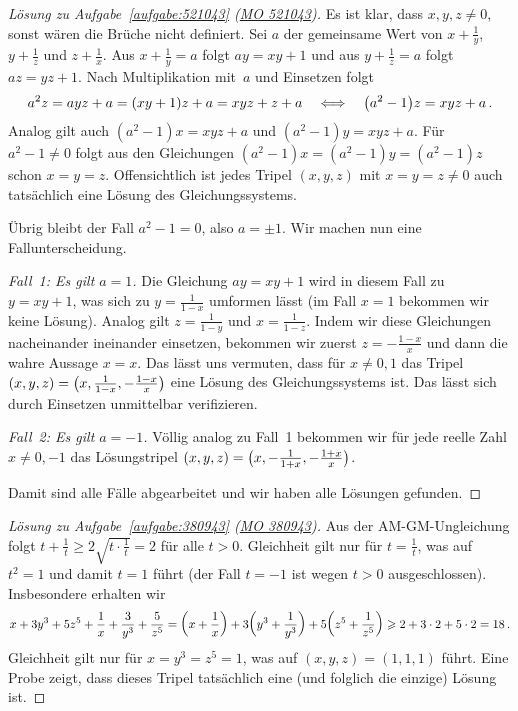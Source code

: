 \begin{proof}[Lösung zu Aufgabe~\ref{aufgabe:521043} \textmd{(\href{https://www.mathematik-olympiaden.de/moev/index.php?option=com_download&thema=a&format=raw&datei=A52094a.pdf}{MO 521043})}]
	Es ist klar, dass $x,y,z\neq 0$, sonst wären die Brüche nicht definiert. Sei $a$ der gemeinsame Wert von $x+\frac 1y$, $y+\frac 1z$ und $z+\frac 1x$. Aus $x+\frac 1y=a$ folgt $ay=xy+1$ und aus $y+\frac 1z=a$ folgt $az=yz+1$. Nach Multiplikation mit~$a$ und Einsetzen folgt
	\begin{equation*}
		a^2z=ayz+a=(xy+1)z+a=xyz+z+a\quad\Longleftrightarrow \quad\parens*{a^2-1}z=xyz+a\,.
	\end{equation*}
	Analog gilt auch $(a^2-1)x=xyz+a$ und $(a^2-1)y=xyz+a$. Für $a^2-1\neq 0$ folgt aus den Gleichungen $(a^2-1)x=(a^2-1)y=(a^2-1)z$ schon $x=y=z$. Offensichtlich ist jedes Tripel $(x,y,z)$ mit $x=y=z\neq 0$ auch tatsächlich eine Lösung des Gleichungssystems.
	
	Übrig bleibt der Fall $a^2-1=0$, also $a=\pm 1$. Wir machen nun eine Fallunterscheidung.
	
	\emph{Fall~1: Es gilt $a=1$.} Die Gleichung $ay=xy+1$ wird in diesem Fall zu $y=xy+1$, was sich zu $y=\frac{1}{1-x}$ umformen lässt (im Fall $x=1$ bekommen wir keine Lösung). Analog gilt $z=\frac{1}{1-y}$ und $x=\frac{1}{1-z}$. Indem wir diese Gleichungen nacheinander ineinander einsetzen, bekommen wir zuerst $z=-\frac{1-x}{x}$ und dann die wahre Aussage $x=x$. Das lässt uns vermuten, dass für $x\neq 0,1$ das Tripel $(x,y,z)=\parens[\big]{x,\frac{1}{1-x},-\frac{1-x}{x}}$ eine Lösung des Gleichungssystems ist. Das lässt sich durch Einsetzen unmittelbar verifizieren.
	
	
	\emph{Fall~2: Es gilt $a=-1$.} Völlig analog zu Fall~1 bekommen wir für jede reelle Zahl $x\neq 0,-1$ das Lösungstripel $(x,y,z)=\parens[\big]{x,-\frac{1}{1+x},-\frac{1+x}{x}}$.
	
	Damit sind alle Fälle abgearbeitet und wir haben alle Lösungen gefunden.
\end{proof}
\begin{proof}[Lösung zu Aufgabe~\ref{aufgabe:380943} \textmd{(\href{https://www.mathematik-olympiaden.de/moev/index.php?option=com_download&thema=a&format=raw&datei=A38094a.pdf}{MO 380943})}]
	Aus der AM-GM-Ungleichung folgt $t+\frac 1t\geqslant 2\sqrt{t\cdot\frac 1t}=2$ für alle $t>0$. Gleichheit gilt nur für $t=\frac 1t$, was auf $t^2=1$ und damit $t=1$ führt (der Fall $t=-1$ ist wegen $t>0$ ausgeschlossen). Insbesondere erhalten wir
	\begin{equation*}
		x+3y^3+5z^5+\frac 1x+\frac3{y^3}+\frac5{z^5}=\parens*{x+\frac 1x}+3\parens*{y^3+\frac1{y^3}}+5\parens*{z^5+\frac1{z^5}}\geqslant 2+3\cdot 2+5\cdot 2=18\,.
	\end{equation*}
	Gleichheit gilt nur für $x=y^3=z^5=1$, was auf $(x,y,z)=(1,1,1)$ führt. Eine Probe zeigt, dass dieses Tripel tatsächlich eine (und folglich die einzige) Lösung ist.
\end{proof}
